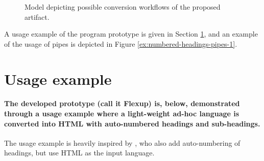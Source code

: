 \documentclass{scrreprt}
\begin{document}
\begin{figure}[h]
  \centering


  \caption{Model depicting possible conversion workflows of the proposed artifact.}
  \label{fig:model-of-conversion-prototype-artifact}
\end{figure}

A usage example of the program prototype is given in Section \ref{sec:usage-example}, and an example of the usage of pipes is depicted in Figure \ref{ex:numbered-headings-pipes-1}.














%
%



\section{Usage example}
\label{sec:usage-example}

\paragraph{The developed prototype (call it Flexup) is, below, demonstrated through a usage example where a light-weight ad-hoc language is converted into HTML with auto-numbered headings and sub-headings.} The usage example is heavily inspired by \citet{krijnen}, who also add auto-numbering of headings, but use HTML as the input language.
\end{document}
